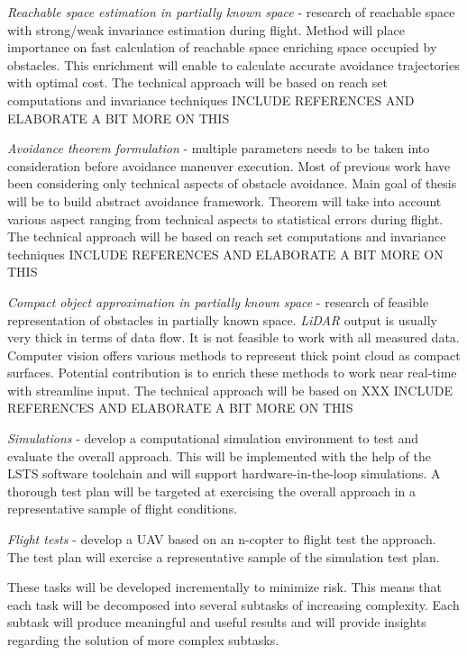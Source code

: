 \textit{Reachable space estimation in partially known space} - research of reachable space with strong/weak invariance estimation during flight. Method will place importance on fast calculation of reachable space enriching space occupied by obstacles. This enrichment will enable to calculate accurate avoidance trajectories with optimal cost. The technical approach will be based on reach set computations and invariance techniques INCLUDE REFERENCES AND ELABORATE A BIT MORE ON THIS

\textit{Avoidance theorem formulation} - multiple parameters needs to be taken into consideration before avoidance maneuver execution. Most of previous work have been considering only technical aspects of obstacle avoidance. Main goal of thesis will be to build abstract avoidance framework. Theorem will take into account various aspect ranging from technical aspects to statistical errors during flight. The technical approach will be based on reach set computations and invariance techniques INCLUDE REFERENCES AND ELABORATE A BIT MORE ON THIS


\textit{Compact object approximation in partially known space} - research of feasible representation of obstacles in partially known space. \textit{LiDAR} output is usually very thick in terms of data flow. It is not feasible to work with all measured data. Computer vision offers various methods to represent thick point cloud as compact surfaces. Potential contribution is to enrich these methods to work near real-time with streamline input. The technical approach will be based on XXX INCLUDE REFERENCES AND ELABORATE A BIT MORE ON THIS

\textit{Simulations} - develop a computational simulation environment to test and evaluate the overall approach. This will be implemented with the help of the LSTS software toolchain and will support hardware-in-the-loop simulations. A thorough test plan will be targeted at exercising the overall approach in a representative sample of flight conditions.

\textit{Flight tests} - develop a UAV based on an n-copter to flight test the approach. The test plan will exercise a representative sample of the simulation test plan. 

These tasks will be developed incrementally to minimize risk. This means that each task will be decomposed into several subtasks of increasing complexity. Each subtask will produce meaningful and useful results and will provide insights regarding the solution of more complex subtasks. 



